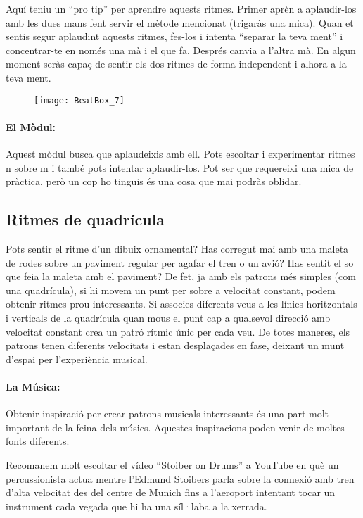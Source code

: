 Aquí teniu un ``pro tip'' per aprendre aquests ritmes. Primer aprèn a aplaudir-los amb les dues mans fent servir el mètode mencionat (trigaràs una mica). Quan et sentis segur aplaudint aquests ritmes, fes-los i intenta ``separar la teva ment'' i concentrar-te en només una mà i el que fa. Després canvia a l'altra mà. En algun moment seràs capaç de sentir els dos ritmes de forma independent i alhora a la teva ment.

\begin{figure}[h]
\centering
\texttt{[image: BeatBox\_7]}
\end{figure}

\paragraph{El Mòdul:} Aquest mòdul busca que aplaudeixis amb ell. Pots escoltar i experimentar ritmes n sobre m i també pots intentar aplaudir-los. Pot ser que requereixi una mica de pràctica, però un cop ho tinguis és una cosa que mai podràs oblidar.

\subsection{Ritmes de quadrícula}
Pots sentir el ritme d'un dibuix ornamental? Has corregut mai amb una maleta de rodes sobre un paviment regular per agafar el tren o un avió? Has sentit el so que feia la maleta amb el paviment? De fet, ja amb els patrons més simples (com una quadrícula), si hi movem un punt per sobre a velocitat constant, podem obtenir ritmes prou interessants. Si associes diferents veus a les línies horitzontals i verticals de la quadrícula quan mous el punt cap a qualsevol direcció amb velocitat constant crea un patró rítmic únic per cada veu. De totes maneres, els patrons tenen diferents velocitats i estan desplaçades en fase, deixant un munt d'espai per l'experiència musical.

\paragraph{La Música:}
Obtenir inspiració per crear patrons musicals interessants és una part molt important de la feina dels músics. Aquestes inspiracions poden venir de moltes fonts diferents.

Recomanem molt escoltar el vídeo ``Stoiber on Drums'' a YouTube en què un percussionista actua mentre
l'Edmund Stoibers parla sobre la connexió amb tren d'alta velocitat des del centre de Munich fins a l'aeroport intentant tocar un instrument cada vegada que hi ha una síl·laba a la xerrada.

